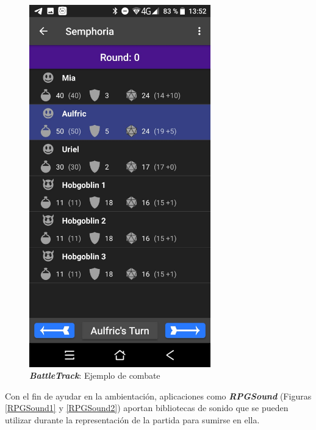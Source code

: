 \begin{figure}[H]
\begin{minipage}{0.3\textwidth}
    \end{minipage} \hspace{2cm}
    \begin{minipage}{0.3\textwidth}
        \centering
        \includegraphics[width=0.7\textwidth]{Images/BattleTrack_2.jpeg}
        \caption{\textit{\textbf{BattleTrack}}: Ejemplo de combate}
        \label{BattleTrack2}           
    \end{minipage}
\end{figure}

Con el fin de ayudar en la ambientación, aplicaciones como 
\textit{\textbf{RPGSound}} (Figuras \ref*{RPGSound1} y \ref*{RPGSound2}) 
aportan bibliotecas de sonido que se pueden 
utilizar durante la representación de la partida para sumirse en ella.
 
